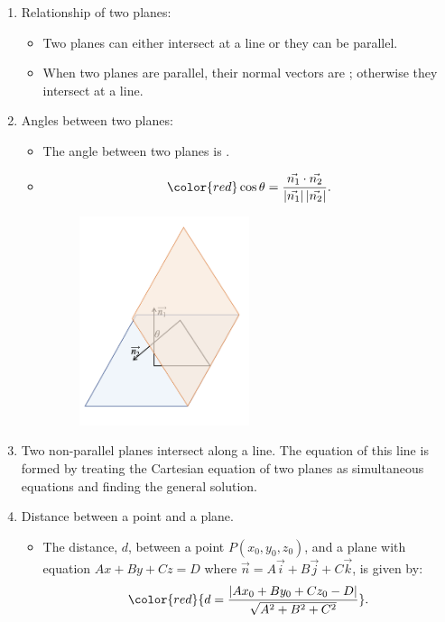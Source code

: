 \documentclass[12pt, a4paper]{article}
\begin{document}
\begin{enumerate}
  \item Relationship of two planes: 
  \begin{itemize}
    \item Two planes can either intersect at a line or they can be parallel.
    \item When two planes are parallel, their normal vectors are {\color{red}{colinear}}; otherwise they intersect at a line. 
  \end{itemize}
  \item Angles between two planes: 
  \begin{itemize}
    \item The angle between two planes is \textbf{\color{red}{the angle between their normal vectors}}.
    \item $$\color{red} \cos\theta=\frac{\vec{n_1}\cdot\vec{n_2}}{\left|\vec{n_1}\right|\left|\vec{n_2}\right|}.$$
    \begin{figure}[H]
      \centering
      \includegraphics[width=0.5\textwidth]{Fig.3.15.jpg}
    \end{figure}
  \end{itemize}
  \item Two non-parallel planes intersect along a line. The equation of this line is formed by treating the Cartesian equation of two planes as simultaneous equations and finding the general solution.
  \item Distance between a point and a plane. 
  \begin{itemize}
    \item The distance, $d$, between a point $P(x_0,y_0,z_0)$, and a plane with equation $Ax+By+Cz=D$ where $\vec{n}=A\vec{i}+B\vec{j}+C\vec{k}$, is given by: 
    $${\color{red}{d=\frac{\left|Ax_0+By_0+Cz_0-D\right|}{\sqrt{A^2+B^2+C^2}}}}.$$ 

\end{itemize}
\end{enumerate}
\end{document}
